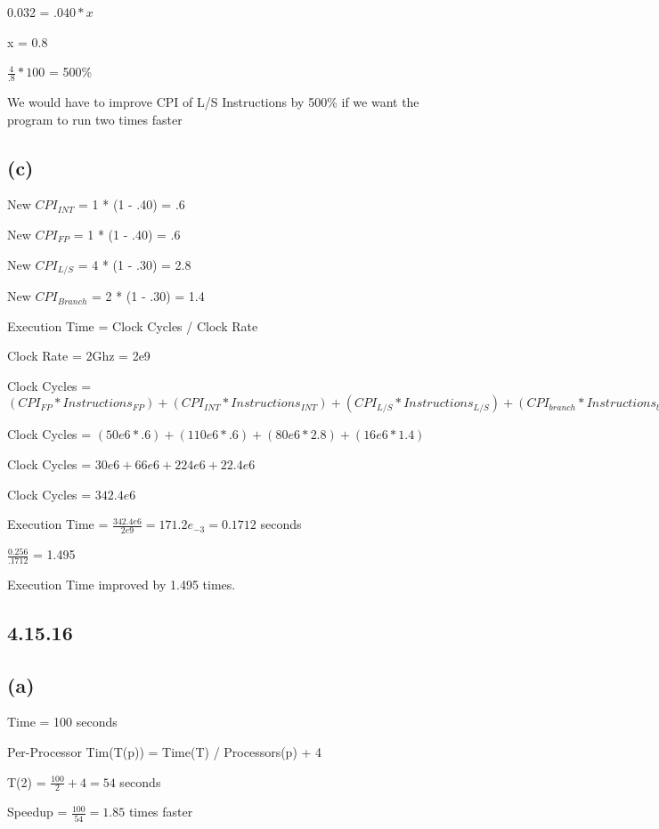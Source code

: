 \documentclass{article}
\begin{document}
    0.032 = $.040 * x$

    x = 0.8

    $\frac{4}{.8} * 100$ = 500\%

    We would have to improve CPI of L/S Instructions by 500\% if we want the program to run two times faster

    \subsection*{(c)}

    New $CPI_{INT}$ = 1 * (1 - .40) = .6

    New $CPI_{FP}$ = 1 * (1 - .40) = .6

    New $CPI_{L/S}$ = 4 * (1 - .30) = 2.8

    New $CPI_{Branch}$ = 2 * (1 - .30) = 1.4

    Execution Time = Clock Cycles / Clock Rate

    Clock Rate = 2Ghz = 2e9

    Clock Cycles = $(CPI_{FP} * Instructions_{FP}) + (CPI_{INT} * Instructions_{INT}) + (CPI_{L/S} * Instructions_{L/S}) + (CPI_{branch}* Instructions_{branch})$

    Clock Cycles = $(50e6 * .6) + (110e6 * .6) + (80e6 * 2.8) + (16e6 * 1.4)$

    Clock Cycles = $30e6 + 66e6 + 224e6 + 22.4e6$

    Clock Cycles = $342.4e6$

    Execution Time = $\frac{342.4e6}{2e9} = 171.2e_{-3} = 0.1712$ seconds

    $\frac{0.256}{.1712}$ = 1.495

    Execution Time improved by 1.495 times.

    \subsection*{4.15.16}
    
    \subsection*{(a)}

    Time = 100 seconds

    Per-Processor Tim(T(p)) = Time(T) / Processors(p) + 4

    T(2) = $\frac{100}{2} + 4 = 54$ seconds

    Speedup = $\frac{100}{54} = 1.85$ times faster
\end{document}
